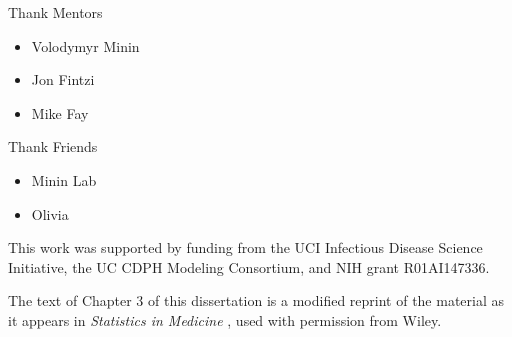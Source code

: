 \acknowledgments
{
  
  

  Thank Mentors
  \begin{itemize}
      \item Volodymyr Minin
      \item Jon Fintzi
      \item Mike Fay
  \end{itemize}

  Thank Friends
  \begin{itemize}
      \item Minin Lab
      \item Olivia
  \end{itemize}

This work was supported by funding from the UCI Infectious Disease Science Initiative, the UC CDPH Modeling Consortium, and NIH grant R01AI147336.

The text of Chapter 3 of this dissertation is a modified reprint of the material as it appears in \textit{Statistics in Medicine} \citep{Bayer2023Confidence}, used with permission from Wiley.

}
